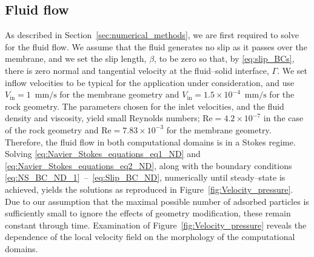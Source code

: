 \documentclass[preprint, 1p, authoryear]{elsarticle}
\begin{document}
\subsection{Fluid flow}
As described in Section~\ref{sec:numerical_methods}, we are first required to solve for the fluid flow.  
We assume that the fluid generates no slip as it passes over the membrane, and we set the slip length, $\beta$, to be zero so that, by  \eqref{eq:slip_BCs},  there is zero normal and tangential velocity at the fluid--solid interface, $\Gamma$.  We set inflow velocities  to be typical for the application under consideration, and use  $V_{\text{in}} = 1$~$\mathrm{mm}/\mathrm{s}$ for the membrane geometry and  $V_{\text{in}} = 1.5 \times 10^{-4}$~$\mathrm{mm}/\mathrm{s}$ for the rock geometry. The parameters chosen  for the inlet velocities, and the fluid density and viscosity, yield small Reynolds numbers; $\mathrm{Re} =  4.2 \times 10^{-7}$ in the case of the rock geometry and $\mathrm{Re} = 7.83 \times 10^{-3}$ for the membrane geometry. Therefore, the fluid flow in both computational domains is in a Stokes regime.    Solving \eqref{eq:Navier_Stokes_equations_eq1_ND} and  \eqref{eq:Navier_Stokes_equations_eq2_ND}, along with the boundary conditions \eqref{eq:NS_BC_ND_1}~--~\eqref{eq:Slip_BC_ND}, numerically until steady--state is achieved, yields the solutions as reproduced in Figure~\ref{fig:Velocity_pressure}. Due to our assumption that the maximal possible number of adsorbed particles  is sufficiently small to ignore the effects of geometry modification, these remain constant through time. 
Examination of Figure~\ref{fig:Velocity_pressure} reveals the dependence of the local velocity field on the morphology of the computational domains. 
\end{document}
